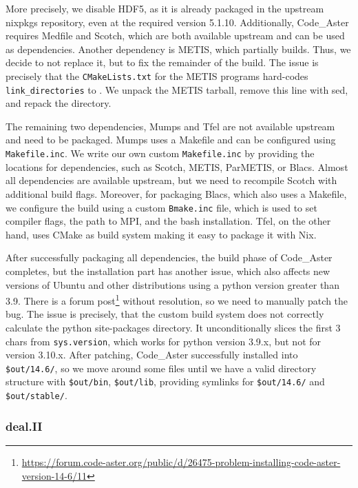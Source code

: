 \documentclass{eceasst}
\begin{document}
More precisely, we disable HDF5, as it is already packaged in the upstream nixpkgs repository, even at the required version 5.1.10.
Additionally, Code\_Aster requires Medfile and Scotch, which are both available upstream and can be used as dependencies.
Another dependency is METIS, which partially builds. Thus, we decide to not replace it, but to fix the remainder of the build.
The issue is precisely that the \texttt{CMakeLists.txt} for the METIS programs hard-codes \texttt{link\_directories} to .
We unpack the METIS tarball, remove this line with sed, and repack the directory.

The remaining two dependencies, Mumps and Tfel are not available upstream and need to be packaged.
Mumps uses a Makefile and can be configured using \texttt{Makefile.inc}.
We write our own custom \texttt{Makefile.inc} by providing the locations for dependencies, such as Scotch, METIS, ParMETIS, or Blacs.
Almost all dependencies are available upstream, but we need to recompile Scotch with additional build flags.
Moreover, for packaging Blacs, which also uses a Makefile, we configure the build using a custom \texttt{Bmake.inc} file, which is used to set compiler flags, the path to MPI, and the bash installation.
Tfel, on the other hand, uses CMake as build system making it easy to package it with Nix.

After successfully packaging all dependencies, the build phase of Code\_Aster completes, but the installation part has another issue, which also affects new versions of Ubuntu and other distributions using a python version greater than 3.9.
There is a forum post\footnote{\url{https://forum.code-aster.org/public/d/26475-problem-installing-code-aster-version-14-6/11}} without resolution, so we need to manually patch the bug.
The issue is precisely, that the custom build system does not correctly calculate the python site-packages directory.
It unconditionally slices the first 3 chars from \texttt{sys.version}, which works for python version 3.9.x, but not for version 3.10.x.
After patching, Code\_Aster successfully installed into \texttt{\$out/14.6/}, so we move around some files until we have a valid directory structure with \texttt{\$out/bin}, \texttt{\$out/lib}, providing symlinks for \texttt{\$out/14.6/} and \texttt{\$out/stable/}.

\subsubsection{deal.II}
\end{document}
